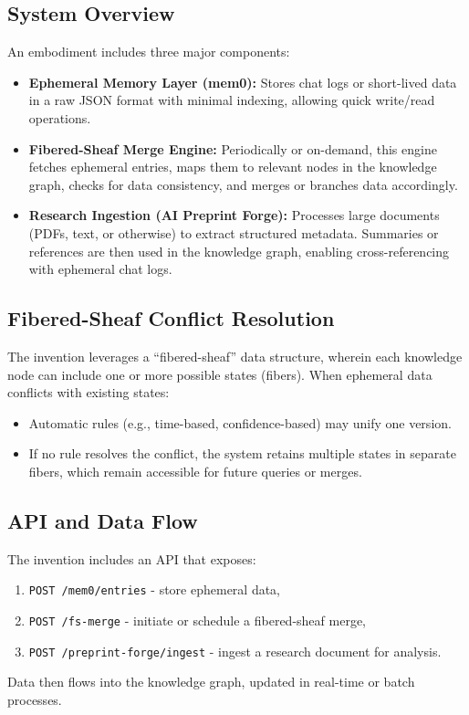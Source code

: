 \documentclass[12pt]{article}
\begin{document}
\subsection*{System Overview}
An embodiment includes three major components:
\begin{itemize}
  \item \textbf{Ephemeral Memory Layer (mem0):} Stores chat logs or short-lived data
        in a raw JSON format with minimal indexing, allowing quick write/read operations.
  \item \textbf{Fibered-Sheaf Merge Engine:} Periodically or on-demand, this engine
        fetches ephemeral entries, maps them to relevant nodes in the knowledge graph,
        checks for data consistency, and merges or branches data accordingly.
  \item \textbf{Research Ingestion (AI Preprint Forge):} Processes large documents (PDFs,
        text, or otherwise) to extract structured metadata. Summaries or references are 
        then used in the knowledge graph, enabling cross-referencing with ephemeral chat logs.
\end{itemize}

\subsection*{Fibered-Sheaf Conflict Resolution}
The invention leverages a “fibered-sheaf” data structure, wherein each knowledge node can
include one or more possible states (fibers). When ephemeral data conflicts with existing
states:
\begin{itemize}
  \item Automatic rules (e.g., time-based, confidence-based) may unify one version.
  \item If no rule resolves the conflict, the system retains multiple states in separate
        fibers, which remain accessible for future queries or merges.
\end{itemize}

\subsection*{API and Data Flow}
The invention includes an API that exposes:
\begin{enumerate}
  \item \texttt{POST /mem0/entries} - store ephemeral data,
  \item \texttt{POST /fs-merge} - initiate or schedule a fibered-sheaf merge,
  \item \texttt{POST /preprint-forge/ingest} - ingest a research document for analysis.
\end{enumerate}
Data then flows into the knowledge graph, updated in real-time or batch processes.
\end{document}
